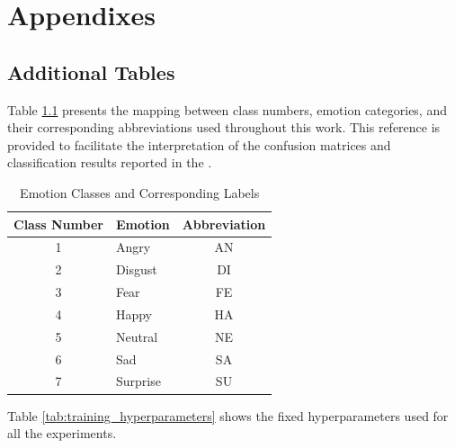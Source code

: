 
\chapter{Appendixes}
\label{chapter:appendixes}

\newpage

\section{Additional Tables}

Table \ref{tab:emotion_classes} presents the mapping between class numbers, emotion categories, and their corresponding abbreviations used throughout this work. This reference is provided to facilitate the interpretation of the confusion matrices and classification results reported in the .

\begin{table}[h]
\centering
\caption{Emotion Classes and Corresponding Labels}
\label{tab:emotion_classes}
\begin{tabular}{c l c}
\hline
\textbf{Class Number} & \textbf{Emotion} & \textbf{Abbreviation} \\
\hline
1 & Angry    & AN \\
2 & Disgust  & DI \\
3 & Fear     & FE \\
4 & Happy    & HA \\
5 & Neutral  & NE \\
6 & Sad      & SA \\
7 & Surprise & SU \\
\hline
\end{tabular}
\end{table}

Table \ref{tab:training_hyperparameters} shows the fixed hyperparameters used for all the experiments. 

